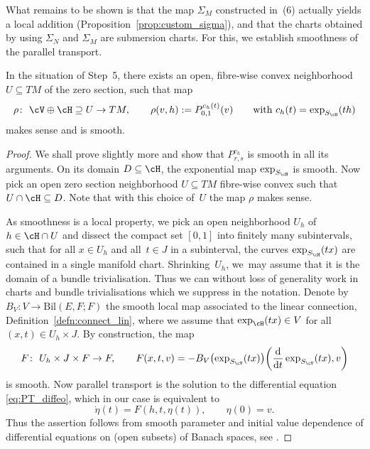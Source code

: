What remains to be shown is that the map $\Sigma_{M}$ constructed in~(6) actually yields a local addition (Proposition~\ref{prop:custom_sigma}), and that the charts obtained by using $\Sigma_{N}$ and $\Sigma_{M}$ are submersion charts.
For this, we establish smoothness of the parallel transport.

\begin{Lemma}\label{lem:smooth_aux}
In the situation of Step~{\rm 5}, there exists an open, fibre-wise convex neighborhood ${U \subseteq TM}$ of the zero section, such that map
\begin{displaymath}
\rho \colon \ \cV \oplus \cH \supseteq U \rightarrow TM, \qquad \rho (v,h) := P_{0,1}^{c_h(t)}(v) \qquad \text{with } c_h (t) = \exp_{S_{\cH}} (th)
\end{displaymath}
makes sense and is smooth.
\end{Lemma}

\begin{proof}
 We shall prove slightly more and show that $P_{r,s}^{c_h}$ is smooth in all its arguments.
On its domain $D\subseteq \cH$, the exponential map $\exp_{S_{\cH}}$ is smooth. Now pick an open zero section neighborhood $U\subseteq TM$ fibre-wise convex such that $U \cap \cH \subseteq D$. Note that with this choice of~$U$ the map $\rho$ makes sense.

As smoothness is a local property, we pick an open neighborhood $U_h$ of $h \in \cH \cap U$ and dissect the compact set $[0,1]$ into finitely many subintervals, such that for all $x\in U_h$ and all~${t \in J}$ in a subinterval, the curves $\exp_{S_\cH}(tx)$ are contained in a single manifold chart. Shrinking~${U_h}$, we~may assume that it is the domain of a bundle trivialisation. Thus we can without loss of generality work in charts and bundle trivialisations which we suppress in the notation. Denote by $B_V \colon V \rightarrow \text{Bil}(E , F; F)$ the smooth local map associated to the linear connection, Definition~\ref{defn:connect_lin}, where we assume that $\exp_\cH (tx)\in V$ for all $(x,t) \in U_h\times J$. By construction, the map
\begin{displaymath}F \colon\ U_h \times J \times F \rightarrow F, \qquad F(x,t,v) =- B_V\bigl(\exp_{S_{\cV}}(tx)\bigr)\biggl(\frac{{\rm d}}{{\rm d}t}\exp_{S_{\cV}}(tx),v\biggr)
\end{displaymath}
is smooth. Now parallel transport is the solution to the differential equation \eqref{eq:PT_diffeo}, which in our case is equivalent to
\begin{displaymath}
 \dot{\eta}(t) = F(h,t,\eta(t)), \qquad \eta(0)=v.
\end{displaymath}
Thus the assertion follows from smooth parameter and initial value dependence of differential equations on (open subsets) of Banach spaces, see \cite[Chapter~IV, Section~1]{La01}.
\end{proof}

